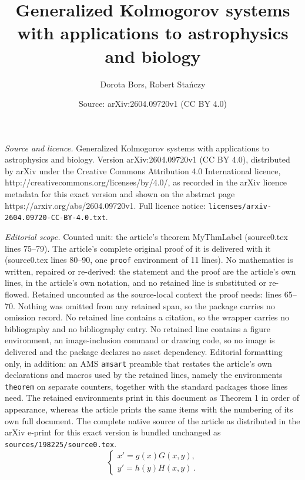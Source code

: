 \documentclass[10pt,a4paper]{amsart}
\title{Generalized Kolmogorov systems with applications to astrophysics and biology}
\author{Dorota Bors, Robert Stańczy}
\date{Source: arXiv:2604.09720v1 (CC BY 4.0)}
\begin{document}
\maketitle

\noindent\emph{Source and licence.} Generalized Kolmogorov systems with applications to astrophysics and biology. Version arXiv:2604.09720v1 (CC BY 4.0), distributed by arXiv under the Creative Commons Attribution 4.0 International licence, http://creativecommons.org/licenses/by/4.0/, as recorded in the arXiv licence metadata for this exact version and shown on the abstract page https://arxiv.org/abs/2604.09720v1. Full licence notice: \texttt{licenses/arxiv-2604.09720-CC-BY-4.0.txt}.\par\smallskip

\noindent\textit{Editorial scope.} Counted unit: the article's theorem MyThmLabel (source0.tex lines 75--79). The article's complete original proof of it is delivered with it (source0.tex lines 80--90, one \texttt{proof} environment of 11 lines). No mathematics is written, repaired or re-derived: the statement and the proof are the article's own lines, in the article's own notation, and no retained line is substituted or re-flowed.  Retained uncounted as the source-local context the proof needs: lines 65--70.  Nothing was omitted from any retained span, so the package carries no omission record.  No retained line contains a citation, so the wrapper carries no bibliography and no bibliography entry.  No retained line contains a figure environment, an image-inclusion command or drawing code, so no image is delivered and the package declares no asset dependency.  Editorial formatting only, in addition: an AMS \texttt{amsart} preamble that restates the article's own declarations and macros used by the retained lines, namely the environments \texttt{theorem} on separate counters, together with the standard packages those lines need.  The retained environments print in this document as Theorem 1 in order of appearance, whereas the article prints the same items with the numbering of its own full document.  The complete native source of the article as distributed in the arXiv e-print for this exact version is bundled unchanged as \texttt{sources/198225/source0.tex}.
\begin{equation}\label{Kol}
	\begin{cases}
		x'=g(x)G(x,y),\\
		y'=h(y)H(x,y)\,.
	\end{cases}
\end{equation}
\end{document}
